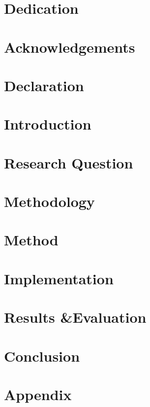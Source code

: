 \documentclass[a4paper,12pt]{report}
\begin{document}



\chapter*{Dedication}

\chapter*{Acknowledgements}

\chapter*{Declaration}


\tableofcontents
\listoffigures
\listoftables

\chapter{Introduction}

\chapter{Research Question}

\chapter{Methodology}

\chapter{Method}

\chapter{Implementation}

\chapter{Results \&Evaluation}

\chapter{Conclusion}


\appendix

\chapter{Appendix}


\printbibliography

\end{document}
